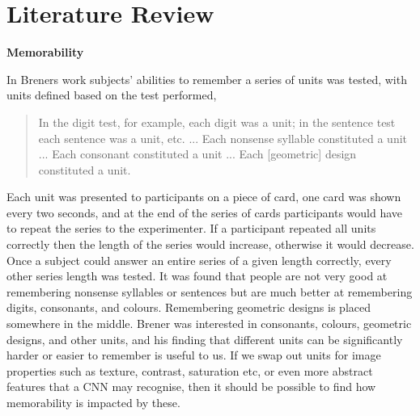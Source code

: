 \documentclass{UoYCSproject}
\begin{document}
\chapter{Literature Review}


\textbf{Memorability}


In Breners work \cite{BrenerMemorySpan} subjects' abilities to remember a series of units was tested, with units defined based on the test performed, 
\begin{quote}
    In the digit test, for example, each digit was a unit; in the sentence test each sentence was a unit, etc. ... Each nonsense syllable constituted a unit ... Each consonant constituted a unit ... Each [geometric] design constituted a unit. \cite[p.468]{BrenerMemorySpan}
\end{quote}

Each unit was presented to participants on a piece of card, one card was shown every two seconds, and at the end of the series of cards participants would have to repeat the series to the experimenter. If a participant repeated all units correctly then the length of the series would increase, otherwise it would decrease. Once a subject could answer an entire series of a given length correctly, every other series length was tested. It was found that people are not very good at remembering nonsense syllables or sentences but are much better at remembering digits, consonants, and colours. Remembering geometric designs is placed somewhere in the middle. Brener was interested in consonants, colours, geometric designs, and other units, and his finding that different units can be significantly harder or easier to remember is useful to us. If we swap out units for image properties such as texture, contrast, saturation etc, or even more abstract features that a CNN may recognise, then it should be possible to find how memorability is impacted by these. 
 
\end{document}
